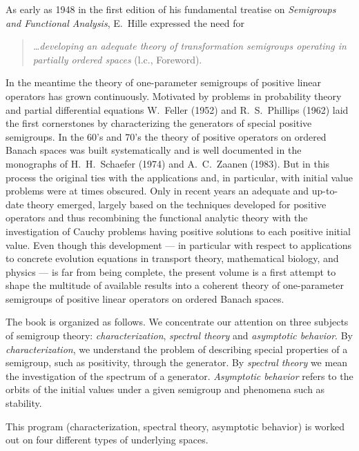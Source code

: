As early as 1948 in the first edition of his fundamental treatise on \emph{Semigroups and Functional Analysis}, E.~Hille expressed the need for 
 \begin{quote}
 \textit{\ldots developing an adequate theory of transformation semigroups operating in partially ordered spaces} (l.c., Foreword). 
 \end{quote}
 In the meantime the theory of one-parameter semigroups of positive linear operators has grown continuously. 
 Motivated by problems in probability theory and partial differential equations W.~Feller (1952) and R.~S.~Phillips (1962) laid the first cornerstones by characterizing the generators of special positive semigroups. 
 In the 60's and 70's the theory of positive operators on ordered Banach spaces was built systematically and is well documented in the monographs of H.~H.~Schaefer (1974) and A.~C.~Zaanen (1983). 
 But in this process the original ties with the applications and, in particular, with initial value problems were at times obscured. 
 Only in recent years an adequate and up-to-date theory emerged, largely based on the techniques developed for positive operators and thus recombining the functional analytic theory with the investigation of Cauchy problems having positive solutions to each positive initial value. 
 Even though this development --- in particular with respect to applications to concrete evolution equations in transport theory, mathematical biology, and physics --- is far from being complete, the present volume is a first attempt to shape the multitude of available results into a coherent theory of one-parameter semigroups of positive linear operators on ordered Banach spaces.
 
 The book is organized as follows.
 We concentrate our attention on three subjects of semigroup theory: \emph{characterization}, \emph{spectral theory} and \emph{asymptotic behavior}. 
 By \emph{characterization}, we understand the problem of describing special properties of a semigroup, such as positivity, through the generator. 
 By \emph{spectral theory} we mean the investigation of the spectrum of a generator. 
 \emph{Asymptotic behavior} refers to the orbits of the initial values under a given semigroup and phenomena such as stability.
 
 This program (characterization, spectral theory, asymptotic behavior) is worked out on four different types of underlying spaces.
 
